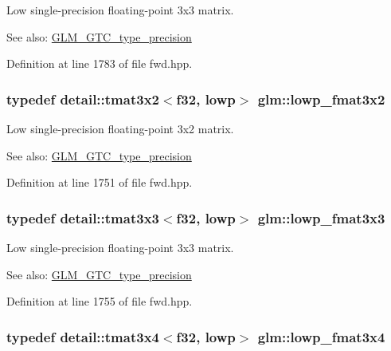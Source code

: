 Low single-precision floating-point 3x3 matrix. \begin{Desc}
\item[See also:]\hyperlink{group__gtc__type__precision}{GLM\_\-GTC\_\-type\_\-precision} \end{Desc}


Definition at line 1783 of file fwd.hpp.\hypertarget{group__gtc__type__precision_g6e03c9a11f7d781af7549ce566844cc6}{
\subsubsection[lowp\_\-fmat3x2]{\setlength{\rightskip}{0pt plus 5cm}typedef detail::tmat3x2$<$f32, lowp$>$ {\bf glm::lowp\_\-fmat3x2}}}
\label{group__gtc__type__precision_g6e03c9a11f7d781af7549ce566844cc6}


Low single-precision floating-point 3x2 matrix. \begin{Desc}
\item[See also:]\hyperlink{group__gtc__type__precision}{GLM\_\-GTC\_\-type\_\-precision} \end{Desc}


Definition at line 1751 of file fwd.hpp.\hypertarget{group__gtc__type__precision_g25b389b52269f3256f015b4fff5789c2}{
\subsubsection[lowp\_\-fmat3x3]{\setlength{\rightskip}{0pt plus 5cm}typedef detail::tmat3x3$<$f32, lowp$>$ {\bf glm::lowp\_\-fmat3x3}}}
\label{group__gtc__type__precision_g25b389b52269f3256f015b4fff5789c2}


Low single-precision floating-point 3x3 matrix. \begin{Desc}
\item[See also:]\hyperlink{group__gtc__type__precision}{GLM\_\-GTC\_\-type\_\-precision} \end{Desc}


Definition at line 1755 of file fwd.hpp.\hypertarget{group__gtc__type__precision_g366a3249a72ddc76fb3ee4f2379cf3fb}{
\subsubsection[lowp\_\-fmat3x4]{\setlength{\rightskip}{0pt plus 5cm}typedef detail::tmat3x4$<$f32, lowp$>$ {\bf glm::lowp\_\-fmat3x4}}}
\label{group__gtc__type__precision_g366a3249a72ddc76fb3ee4f2379cf3fb}


